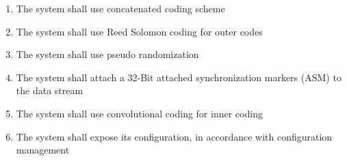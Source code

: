 \begin{enumerate}[leftmargin=\dimexpr\linewidth-13cm-\rightmargin\relax,label={\bfseries{SPC-REQ-\arabic*}}]
\subsection{CCSDS-131.0-B-5}
    \item The system shall use concatenated coding scheme
    \item The system shall use Reed Solomon coding for outer  codes
    \item The system shall use pseudo randomization
    \item The system shall attach a 32-Bit attached synchronization markers (ASM) to the data stream
    \item The system shall use convolutional coding for inner coding
    \item The system shall expose its configuration, in accordance with configuration management
\end{enumerate}


